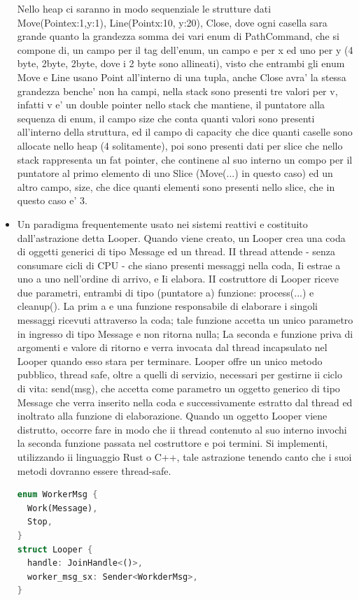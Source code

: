 \documentclass[12pt]{article}
\begin{document}
\begin{itemize}
  Nello heap ci saranno in modo sequenziale le strutture dati Move(Pointe{x:1,y:1}), Line(Point{x:10, y:20}), Close, dove ogni casella sara grande quanto la grandezza somma dei vari enum di PathCommand, che si compone di, un campo per il tag dell'enum, un campo e per x ed uno per y (4 byte, 2byte, 2byte, dove i 2 byte sono allineati), visto che entrambi gli enum Move e Line usano Point all'interno di una tupla, anche Close avra' la stessa grandezza benche' non ha campi, nella stack sono presenti tre valori per v, infatti v e' un double pointer nello stack che mantiene, il puntatore alla sequenza di enum, il campo size che conta quanti valori sono presenti all'interno della struttura, ed il campo di capacity che dice quanti caselle sono allocate nello heap (4 solitamente), poi sono presenti dati per slice che nello stack rappresenta un fat pointer, che continene al suo interno un compo per il puntatore al primo elemento di uno Slice (Move(...) in questo caso) ed un altro campo, size, che dice quanti elementi sono presenti nello slice, che in questo caso e' 3.
  \item Un paradigma frequentemente usato nei sistemi reattivi e costituito dall'astrazione detta Looper.
  Quando viene creato, un Looper crea una coda di oggetti generici di tipo Message ed un thread.
  II thread attende - senza consumare cicli di CPU - che siano presenti messaggi nella coda, Ii
  estrae a uno a uno nell'ordine di arrivo, e Ii elabora. II costruttore di Looper riceve due parametri,
  entrambi di tipo (puntatore a) funzione: process(...) e cleanup(). La prim a e una funzione
  responsabile di elaborare i singoli messaggi ricevuti attraverso la coda; tale funzione accetta un
  unico parametro in ingresso di tipo Message e non ritorna nulla; La seconda e funzione priva di
  argomenti e valore di ritorno e verra invocata dal thread incapsulato nel Looper quando esso
  stara per terminare.
  Looper offre un unico metodo pubblico, thread safe, oltre a quelli di servizio, necessari per
  gestirne ii ciclo di vita: send(msg), che accetta come parametro un oggetto generico di tipo
  Message che verra inserito nella coda e successivamente estratto dal thread ed inoltrato alla
  funzione di elaborazione. Quando un oggetto Looper viene distrutto, occorre fare in modo che ii
  thread contenuto al suo interno invochi la seconda funzione passata nel costruttore e poi termini.
  Si implementi, utilizzando ii linguaggio Rust o C++, tale astrazione tenendo canto che i suoi metodi
  dovranno essere thread-safe.
  \begin{lstlisting}[language=rust]
enum WorkerMsg {
  Work(Message),
  Stop,
}
struct Looper {
  handle: JoinHandle<()>,
  worker_msg_sx: Sender<WorkderMsg>,
}


\end{lstlisting}
\end{itemize}
\end{document}
